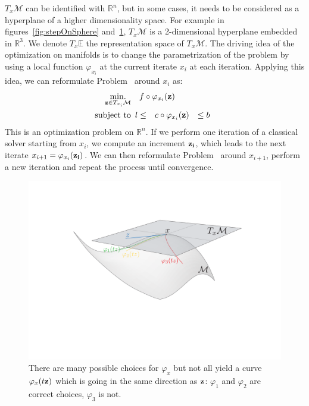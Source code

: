 $T_x\mathcal{M}$ can be identified with $\mathbb{R}^n$, but in some cases, it needs to be considered as a hyperplane of a higher dimensionality space.
For example in figures~\ref{fig:stepOnSphere} and~\ref{fig:phimap}, $T_x\mathcal{M}$ is a 2-dimensional hyperplane embedded in $\mathbb{R}^3$.
We denote $T_x\mathbb{E}$ the representation space of $T_x\mathcal{M}$.
The driving idea of the optimization on manifolds is to change the parametrization of the problem by using a local function $\varphi_{x_i}$ at the current iterate $x_i$ at each iteration.
Applying this idea, we can reformulate Problem~ around $x_i$ as:
\begin{align}
\label{eq:local_problem}
\operatorname*{min.}_{{\bf z} \in T_{x_i}\mathcal{M}} & \quad f \circ \varphi_{x_i}({\bf z}) \\
  \text{subject to}&
  \begin{array}{rcl}
    {l} \leq & c \circ \varphi_{x_i}({\bf z}) & \leq {b} \nonumber
  \end{array}
\end{align}
This is an optimization problem on $\mathbb{R}^n$.
If we perform one iteration of a classical solver starting from $x_i$, we compute an increment ${\bf z_i}$, which leads to the next iterate $x_{i+1} = \varphi_{x_i}({\bf z_i})$.
We can then reformulate Problem~ around $x_{i+1}$, perform a new iteration and repeat the process until convergence.

\begin{figure}[!htb]
  \centering
  \includegraphics[width=.9\linewidth]{Humanoids2015/manifold.pdf}
  \caption{There are many possible choices for $\varphi_{x}$ but not all yield a curve $\varphi_{x}(t{\bf z})$ which is going in the same direction as ${\bf z}$: $\varphi_{1}$ and $\varphi_{2}$ are correct choices, $\varphi_{3}$ is not.}
\label{fig:phimap}
\end{figure}

